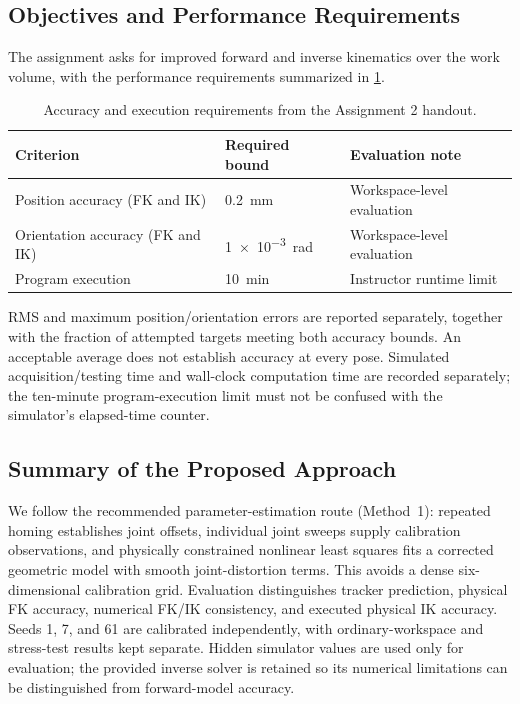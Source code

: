 \documentclass[11pt,letterpaper]{article}
\begin{document}
\subsection{Objectives and Performance Requirements}
The assignment asks for improved forward and inverse kinematics over the work volume, with the performance requirements summarized in \cref{tab:requirements}.
\begin{table}[!htbp]\centering
\caption{Accuracy and execution requirements from the Assignment 2 handout.}\label{tab:requirements}
\begin{tabular}{@{}lll@{}}\toprule
Criterion & Required bound & Evaluation note\\\midrule
Position accuracy (FK and IK) & \SI{0.2}{\milli\metre} & Workspace-level evaluation\\
Orientation accuracy (FK and IK) & \SI{1e-3}{\radian} & Workspace-level evaluation\\
Program execution & \SI{10}{\minute} & Instructor runtime limit\\\bottomrule
\end{tabular}
\end{table}
RMS and maximum position/orientation errors are reported separately, together with the fraction of attempted targets meeting both accuracy bounds. An acceptable average does not establish accuracy at every pose. Simulated acquisition/testing time and wall-clock computation time are recorded separately; the ten-minute program-execution limit must not be confused with the simulator's elapsed-time counter.

\subsection{Summary of the Proposed Approach}
We follow the recommended parameter-estimation route (Method~1): repeated homing establishes joint offsets, individual joint sweeps supply calibration observations, and physically constrained nonlinear least squares fits a corrected geometric model with smooth joint-distortion terms. This avoids a dense six-dimensional calibration grid. Evaluation distinguishes tracker prediction, physical FK accuracy, numerical FK/IK consistency, and executed physical IK accuracy. Seeds 1, 7, and 61 are calibrated independently, with ordinary-workspace and stress-test results kept separate. Hidden simulator values are used only for evaluation; the provided inverse solver is retained so its numerical limitations can be distinguished from forward-model accuracy.
\end{document}
